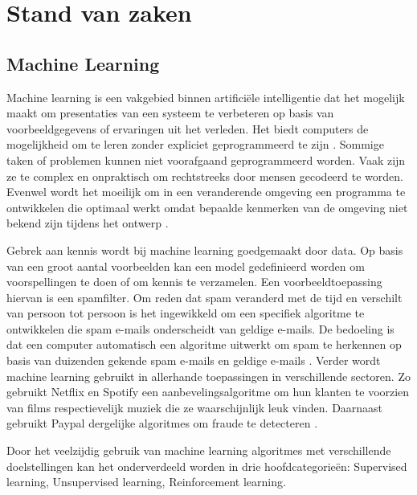 \chapter{Stand van zaken}
\label{ch:stand-van-zaken}



\section{Machine Learning}
\label{sec:Machine Learning}
Machine learning is een vakgebied binnen artificiële intelligentie dat het mogelijk maakt om presentaties van een systeem te verbeteren op basis van voorbeeldgegevens of ervaringen uit het verleden. Het biedt computers de mogelijkheid om te leren zonder expliciet geprogrammeerd te zijn \autocite{Spark}.
Sommige taken of problemen kunnen niet voorafgaand geprogrammeerd worden. Vaak zijn ze te complex en onpraktisch om rechtstreeks door mensen gecodeerd te worden. Evenwel wordt het moeilijk om in een veranderende omgeving een programma te ontwikkelen die optimaal werkt omdat bepaalde kenmerken van de omgeving niet bekend zijn tijdens het ontwerp \autocite{Stanford}.

Gebrek aan kennis wordt bij machine learning goedgemaakt door data. Op basis van een groot aantal voorbeelden kan een model gedefinieerd worden om voorspellingen te doen of om kennis te verzamelen.  Een voorbeeldtoepassing hiervan is een spamfilter. Om reden dat spam veranderd met de tijd en verschilt van persoon tot persoon is het ingewikkeld om een specifiek algoritme te ontwikkelen die spam e-mails onderscheidt van geldige e-mails. De bedoeling is dat een computer automatisch een algoritme uitwerkt om spam te herkennen op basis van duizenden gekende spam e-mails en geldige e-mails \autocite{Alpaydin}.
Verder wordt machine learning gebruikt in allerhande toepassingen in verschillende sectoren. Zo gebruikt Netflix en Spotify een aanbevelingsalgoritme om hun klanten te voorzien van films respectievelijk muziek die ze waarschijnlijk leuk vinden. Daarnaast gebruikt Paypal dergelijke algoritmes om fraude te detecteren \autocite{Redpixie}.

Door het veelzijdig gebruik van machine learning algoritmes met verschillende doelstellingen kan het onderverdeeld worden in drie hoofdcategorieën: Supervised learning, Unsupervised learning, Reinforcement learning.


